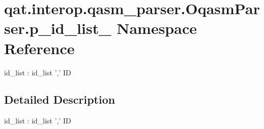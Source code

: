 \hypertarget{namespaceqat_1_1interop_1_1qasm__parser_1_1OqasmParser_1_1p__id__list__1}{\section{qat.\-interop.\-qasm\-\_\-parser.\-Oqasm\-Parser.\-p\-\_\-id\-\_\-list\-\_ Namespace Reference}
\label{namespaceqat_1_1interop_1_1qasm__parser_1_1OqasmParser_1_1p__id__list__1}
}


id\-\_\-list \-: id\-\_\-list ',' I\-D  




\subsection{Detailed Description}
id\-\_\-list \-: id\-\_\-list ',' I\-D 